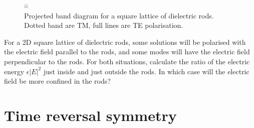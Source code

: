 \begin{figure}
\centering
\includegraphics[width=8]{symmetry/figures/square_bands}
\caption{Projected band diagram for a square lattice of dielectric rods. Dotted band are TM, full lines are TE polarisation.}
\label{fig-bands-rods}
\end{figure}


\begin{exer}
For a 2D square lattice of dielectric rods, some solutions will be polarised with the electric field parallel to the rods, and some modes will have the electric field perpendicular to the rods. For both situations, calculate the ratio of the electric energy $\epsilon |E|^2$ just inside and just outside the rods. In which case will the electric field be more confined in the rods?
\end{exer}

 
\pagebreak

\section{Time reversal symmetry}

